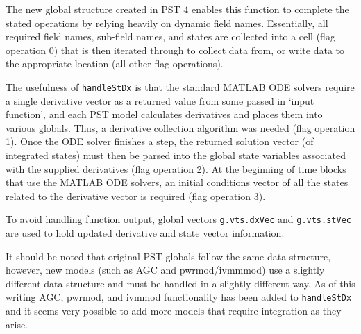 The new global structure created in PST 4 enables this function to complete the stated operations by relying heavily on dynamic field names. 
Essentially, all required field names, sub-field names, and states are collected into a cell (flag operation 0) that is then iterated through to collect data from, or write data to the appropriate location (all other flag operations).

The usefulness of \verb|handleStDx| is that the standard MATLAB ODE solvers require a single derivative vector as a returned value from some passed in `input function', and each PST model calculates derivatives and places them into various globals. 
Thus, a derivative collection algorithm was needed (flag operation 1).
Once the ODE solver finishes a step, the returned solution vector (of integrated states) must then be parsed into the global state variables associated with the supplied derivatives (flag operation 2).
At the beginning of time blocks that use the MATLAB ODE solvers, an initial conditions vector of all the states related to the derivative vector is required (flag operation 3).

To avoid handling function output, global vectors \verb|g.vts.dxVec| and \verb|g.vts.stVec| are used to hold updated derivative and state vector information.

It should be noted that original PST globals follow the same data structure,
however, new models (such as AGC and pwrmod/ivmmmod) use a slightly different data structure and must be handled in a slightly different way.
As of this writing AGC, pwrmod, and ivmmod functionality has been added to \verb|handleStDx| and it seems very possible to add more models that require integration as they arise.

